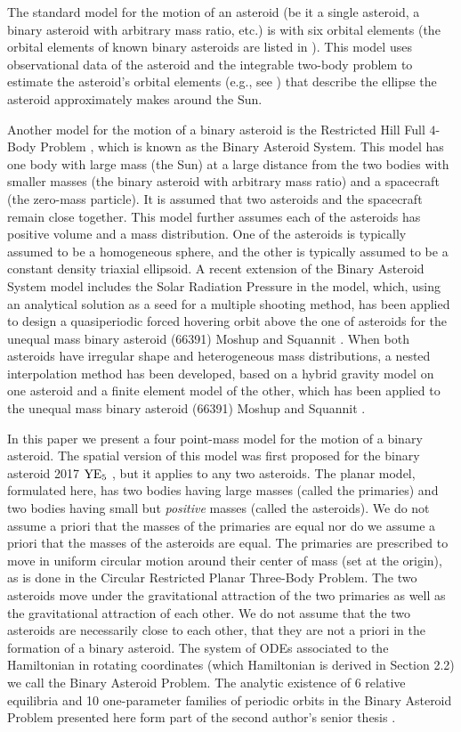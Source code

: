 \documentclass[12pt]{article}
\begin{document}
The standard model for the motion of an asteroid (be it a single asteroid, a binary asteroid with arbitrary mass ratio, etc.) is with six orbital elements (the orbital elements of known binary asteroids are listed in \cite{Johnston}). This model uses observational data of the asteroid and the integrable two-body problem to estimate the asteroid's orbital elements (e.g., see \cite{Espitia}) that describe the ellipse the asteroid approximately makes around the Sun.

Another model for the motion of a binary asteroid is the Restricted Hill Full $4$-Body Problem \cite{Scheeres}, which is known as the Binary Asteroid System. This model has one body with large mass (the Sun) at a large distance from the two bodies with smaller masses (the binary asteroid with arbitrary mass ratio) and a spacecraft (the zero-mass particle). It is assumed that two asteroids and the spacecraft remain close together. This model further assumes each of the asteroids has positive volume and a mass distribution. One of the asteroids is typically assumed to be a homogeneous sphere, and the other is typically assumed to be a constant density triaxial ellipsoid. A recent extension of the Binary Asteroid System model includes the Solar Radiation Pressure in the model, which, using an analytical solution as a seed for a multiple shooting method, has been applied to design a quasiperiodic forced hovering orbit above the one of asteroids for the unequal mass binary asteroid (66391) Moshup and Squannit \cite{Wang}. When both asteroids have irregular shape and heterogeneous mass distributions, a nested interpolation method has been developed, based on a hybrid gravity model on one asteroid and a finite element model of the other, which has been applied to the unequal mass binary asteroid (66391) Moshup and Squannit \cite{Lu}.

In this paper we present a four point-mass model for the motion of a binary asteroid. The spatial version of this model was first proposed for the binary asteroid 2017 ${\rm YE}_5$ \cite{Bakker}, but it applies to any two asteroids. The planar model, formulated here, has two bodies having large masses (called the primaries) and two bodies having small but {\it positive} masses (called the asteroids). We do not assume a priori that the masses of the primaries are equal nor do we assume a priori that the masses of the asteroids are equal. The primaries are prescribed to move in uniform circular motion around their center of mass (set at the origin), as is done in the Circular Restricted Planar Three-Body Problem. The two asteroids move under the gravitational attraction of the two primaries as well as the gravitational attraction of each other. We do not assume that the two asteroids are necessarily close to each other, that they are not a priori in the formation of a binary asteroid. The system of ODEs associated to the Hamiltonian in rotating coordinates (which Hamiltonian is derived in Section 2.2) we call the Binary Asteroid Problem. The analytic existence of 6 relative equilibria and 10 one-parameter families of periodic orbits in the Binary Asteroid Problem presented here form part of the second author's senior thesis \cite{Freeman}.
\end{document}
